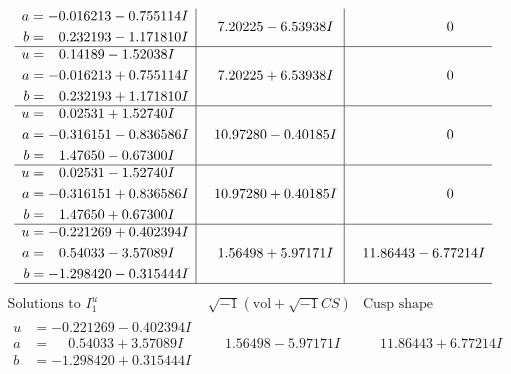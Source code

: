 \documentclass[1p]{elsarticle_modified}
\theoremstyle{definition}
\newcommand{\I}{\sqrt{-1}}
\begin{document}
$$\begin{array}{c|c|c}
\begin{aligned}
a &= -0.016213 - 0.755114 I \\
b &= \phantom{-}0.232193 - 1.171810 I\end{aligned}
 & \phantom{-}7.20225 - 6.53938 I & \phantom{-0.000000 } 0 \\ \hline\begin{aligned}
u &= \phantom{-}0.14189 - 1.52038 I \\
a &= -0.016213 + 0.755114 I \\
b &= \phantom{-}0.232193 + 1.171810 I\end{aligned}
 & \phantom{-}7.20225 + 6.53938 I & \phantom{-0.000000 } 0 \\ \hline\begin{aligned}
u &= \phantom{-}0.02531 + 1.52740 I \\
a &= -0.316151 - 0.836586 I \\
b &= \phantom{-}1.47650 - 0.67300 I\end{aligned}
 & \phantom{-}10.97280 - 0.40185 I & \phantom{-0.000000 } 0 \\ \hline\begin{aligned}
u &= \phantom{-}0.02531 - 1.52740 I \\
a &= -0.316151 + 0.836586 I \\
b &= \phantom{-}1.47650 + 0.67300 I\end{aligned}
 & \phantom{-}10.97280 + 0.40185 I & \phantom{-0.000000 } 0 \\ \hline\begin{aligned}
u &= -0.221269 + 0.402394 I \\
a &= \phantom{-}0.54033 - 3.57089 I \\
b &= -1.298420 - 0.315444 I\end{aligned}
 & \phantom{-}1.56498 + 5.97171 I & \phantom{-}11.86443 - 6.77214 I\\
 \hline 
 \end{array}$$\newpage$$\begin{array}{c|c|c}  
\text{Solutions to }I^u_{1}& \I (\text{vol} + \sqrt{-1}CS) & \text{Cusp shape}\\
 \hline 
\begin{aligned}
u &= -0.221269 - 0.402394 I \\
a &= \phantom{-}0.54033 + 3.57089 I \\
b &= -1.298420 + 0.315444 I\end{aligned}
 & \phantom{-}1.56498 - 5.97171 I & \phantom{-}11.86443 + 6.77214 I \\ \hline\begin{aligned}

\end{aligned}
\end{array}$$
\end{document}
